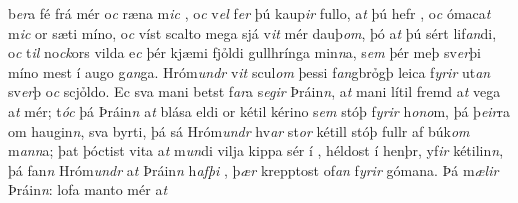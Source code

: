 b\textit{er}a fé frá mér o\textit{c} ræna m\textit{ic} , o\textit{c} v\textit{el} f\textit{er}  þú kaup\textit{ir} fullo, a\textit{t} þú hefr  , o\textit{c}  ómaca\textit{t}  m\textit{ic}
or sæti míno, o\textit{c} víst scalto mega  sjá v\textit{it} mér
dauþ\textit{om}, þó a\textit{t} þú sért lif\textit{an}di, o\textit{c}
t\textit{il} no\textit{ck}ors vilda e\textit{c} þér kjæmi fjỏldi
gullhrínga min\textit{n}a, s\textit{em} þér meþ  sv\textit{er}þi
míno mest í augo g\textit{an}ga. Hróm\textit{undr}  v\textit{it} scul\textit{om} þessi   f\textit{an}gbrỏgþ  leica
f\textit{yrir} ut\textit{an} sv\textit{er}þ o\textit{c} scjỏldo. Ec   sva mani  betst f\textit{ar}a s\textit{egir} Þráin\textit{n},
a\textit{t}  mani lítil fremd   a\textit{t} vega  a\textit{t} mér; t\textit{óc} þá
Þráin\textit{n} a\textit{t} blása eldi or kétil kérino s\textit{em} stóþ f\textit{yrir} h\textit{ono}m,   þá     þ\textit{eir}ra   
om  haugin\textit{n}, sva byrti,
þá sá Hróm\textit{undr} hv\textit{ar} st\textit{or} kétill stóþ   fullr af  búk\textit{om}  m\textit{ann}a; þat þóctist   vita a\textit{t}  m\textit{un}di vilja kippa sér í  ,  héldost   í henþr,   yf\textit{ir}  kétilin\textit{n}, 
þá  fan\textit{n} Hróm\textit{undr}
a\textit{t} Þráin\textit{n} h\textit{afþi}    , þ\textit{ær} krepptost of\textit{an} f\textit{yrir} gómana. Þá
m\textit{ælir} Þráin\textit{n}:  lofa manto mér a\textit{t}
